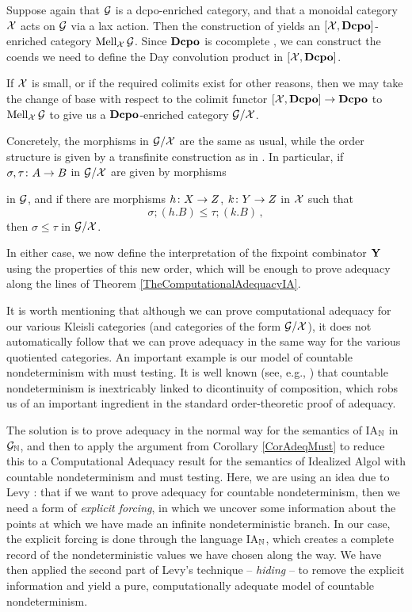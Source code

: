 \documentclass[11pt]{report}
\begin{document}
Suppose again that $\mathcal G$ is a dcpo-enriched category, and that a monoidal category $\mathcal X$ acts on $\mathcal G$ via a lax action.  
Then the construction of \Mellies yields an $[\mathcal X,{\normalfont\textbf{Dcpo}}]$-enriched category $\operatorname{Mell}_\mathcal X\mathcal G$.
Since ${\normalfont\textbf{Dcpo}}$ is cocomplete \cite{CocompleteDcpo}, we can construct the coends we need to define the Day convolution product in $[\mathcal X,{\normalfont\textbf{Dcpo}}]$.

If $\mathcal X$ is small, or if the required colimits exist for other reasons, then we may take the change of base with respect to the colimit functor $[\mathcal X,{\normalfont\textbf{Dcpo}}] \to {\normalfont\textbf{Dcpo}}$ to $\operatorname{Mell}_\mathcal X\mathcal G$ to give us a ${\normalfont\textbf{Dcpo}}$-enriched category $\mathcal G/\mathcal X$.

Concretely, the morphisms in $\mathcal G/\mathcal X$ are the same as usual, while the order structure is given by a transfinite construction as in \cite[2.17]{Fiech}.  
In particular, if $\sigma,\tau\colon A \to B$ in $\mathcal G/\mathcal X$ are given by morphisms
in $\mathcal G$, and if there are morphisms $h\colon X \to Z$, $k\colon Y \to Z$ in $\mathcal X$ such that
\[
  \sigma;(h.B)\le\tau;(k.B)\,,
  \]
then $\sigma\le\tau$ in $\mathcal G/\mathcal X$.

In either case, we now define the interpretation of the fixpoint combinator $\mathbf{Y}$ using the properties of this new order, which will be enough to prove adequacy along the lines of Theorem \ref{TheComputationalAdequacyIA}.

It is worth mentioning that although we can prove computational adequacy for our various Kleisli categories (and categories of the form $\mathcal G/\mathcal X$), it does not automatically follow that we can prove adequacy in the same way for the various quotiented categories.  
An important example is our model of countable nondeterminism with must testing.  
It is well known (see, e.g., \cite{Apt,PlotkinApt}) that countable nondeterminism is inextricably linked to dicontinuity of composition, which robs us of an important ingredient in the standard order-theoretic proof of adequacy.

The solution is to prove adequacy in the normal way for the semantics of IA${}_{\mathbb{N}}$ in $\mathcal G_{\mathbb{N}}$, and then to apply the argument from Corollary \ref{CorAdeqMust} to reduce this to a Computational Adequacy result for the semantics of Idealized Algol with countable nondeterminism and must testing.
Here, we are using an idea due to Levy \cite{LevyGsInfinite}: that if we want to prove adequacy for countable nondeterminism, then we need a form of \emph{explicit forcing}, in which we uncover some information about the points at which we have made an infinite nondeterministic branch.  
In our case, the explicit forcing is done through the language IA${}_{\mathbb{N}}$, which creates a complete record of the nondeterministic values we have chosen along the way.  
We have then applied the second part of Levy's technique -- \emph{hiding} -- to remove the explicit information and yield a pure, computationally adequate model of countable nondeterminism.



\end{document}
